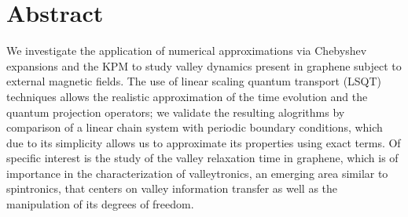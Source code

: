 \chapter{Abstract}

We investigate the application of numerical approximations via Chebyshev expansions and the KPM to study valley dynamics present in graphene subject to external magnetic fields. The use of linear scaling quantum transport (LSQT) techniques allows the realistic approximation of the time evolution and the quantum projection operators; we validate the resulting alogrithms by comparison of a linear chain system with periodic boundary conditions, which due to its simplicity allows us to approximate its properties using exact terms. Of specific interest is the study of the valley relaxation time in graphene, which is of importance in the characterization of valleytronics, an emerging area similar to spintronics, that centers on valley information transfer as well as the manipulation of its degrees of freedom.


